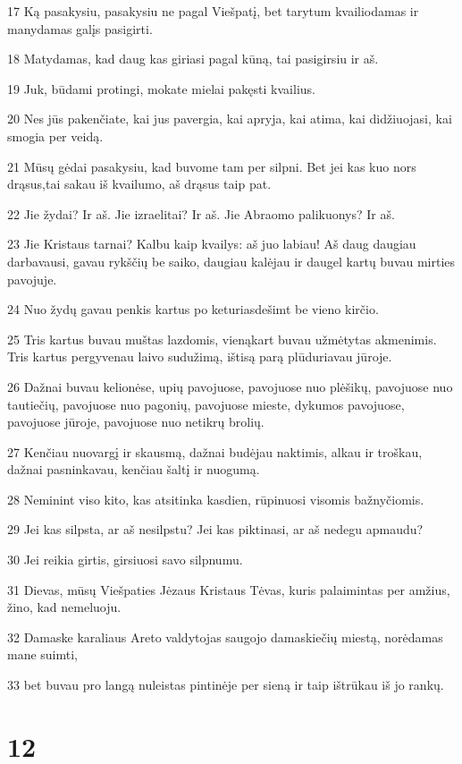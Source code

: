 \par 17 Ką pasakysiu, pasakysiu ne pagal Viešpatį, bet tarytum kvailiodamas ir manydamas galįs pasigirti. 
\par 18 Matydamas, kad daug kas giriasi pagal kūną, tai pasigirsiu ir aš. 
\par 19 Juk, būdami protingi, mokate mielai pakęsti kvailius. 
\par 20 Nes jūs pakenčiate, kai jus pavergia, kai apryja, kai atima, kai didžiuojasi, kai smogia per veidą. 
\par 21 Mūsų gėdai pasakysiu, kad buvome tam per silpni. Bet jei kas kuo nors drąsus,­tai sakau iš kvailumo,­ aš drąsus taip pat. 
\par 22 Jie žydai? Ir aš. Jie izraelitai? Ir aš. Jie Abraomo palikuonys? Ir aš. 
\par 23 Jie Kristaus tarnai? Kalbu kaip kvailys: aš juo labiau! Aš daug daugiau darbavausi, gavau rykščių be saiko, daugiau kalėjau ir daugel kartų buvau mirties pavojuje. 
\par 24 Nuo žydų gavau penkis kartus po keturiasdešimt be vieno kirčio. 
\par 25 Tris kartus buvau muštas lazdomis, vienąkart buvau užmėtytas akmenimis. Tris kartus pergyvenau laivo sudužimą, ištisą parą plūduriavau jūroje. 
\par 26 Dažnai buvau kelionėse, upių pavojuose, pavojuose nuo plėšikų, pavojuose nuo tautiečių, pavojuose nuo pagonių, pavojuose mieste, dykumos pavojuose, pavojuose jūroje, pavojuose nuo netikrų brolių. 
\par 27 Kenčiau nuovargį ir skausmą, dažnai budėjau naktimis, alkau ir troškau, dažnai pasninkavau, kenčiau šaltį ir nuogumą. 
\par 28 Neminint viso kito, kas atsitinka kasdien, rūpinuosi visomis bažnyčiomis. 
\par 29 Jei kas silpsta, ar aš nesilpstu? Jei kas piktinasi, ar aš nedegu apmaudu? 
\par 30 Jei reikia girtis, girsiuosi savo silpnumu. 
\par 31 Dievas, mūsų Viešpaties Jėzaus Kristaus Tėvas, kuris palaimintas per amžius, žino, kad nemeluoju. 
\par 32 Damaske karaliaus Areto valdytojas saugojo damaskiečių miestą, norėdamas mane suimti, 
\par 33 bet buvau pro langą nuleistas pintinėje per sieną ir taip ištrūkau iš jo rankų.


\chapter{12}

